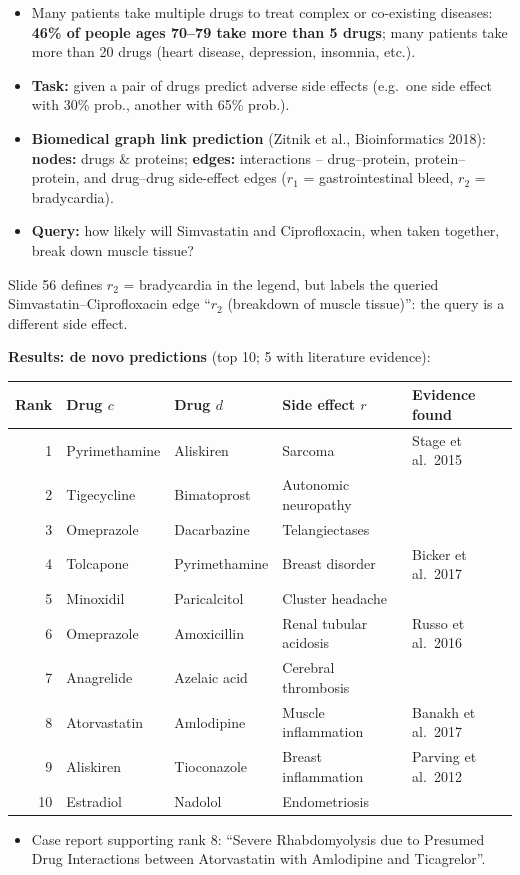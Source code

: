 \begin{itemize}
  \item Many patients take multiple drugs to treat complex or co-existing diseases:
    \textbf{46\% of people ages 70--79 take more than 5 drugs}; many patients take more than
    20 drugs (heart disease, depression, insomnia, etc.).
  \item \textbf{Task:} given a pair of drugs predict adverse side effects (e.g.\ one side
    effect with 30\% prob., another with 65\% prob.).
  \item \textbf{Biomedical graph link prediction} (Zitnik et al., Bioinformatics 2018):
    \textbf{nodes:} drugs \& proteins; \textbf{edges:} interactions -- drug--protein,
    protein--protein, and drug--drug side-effect edges ($r_1$ = gastrointestinal bleed,
    $r_2$ = bradycardia).
  \item \textbf{Query:} how likely will Simvastatin and Ciprofloxacin, when taken together,
    break down muscle tissue?
\end{itemize}

\begin{caution}
  Slide 56 defines $r_2$ = bradycardia in the legend, but labels the queried
  Simvastatin--Ciprofloxacin edge ``$r_2$ (breakdown of muscle tissue)'': the query is a
  different side effect.
\end{caution}

\textbf{Results: de novo predictions} (top 10; 5 with literature evidence):
\begin{center}\small
\begin{tabular}{@{}r l l l l@{}}
  \toprule
  Rank & Drug $c$ & Drug $d$ & Side effect $r$ & Evidence found \\
  \midrule
  1 & Pyrimethamine & Aliskiren & Sarcoma & Stage et al.\ 2015 \\
  2 & Tigecycline & Bimatoprost & Autonomic neuropathy & \\
  3 & Omeprazole & Dacarbazine & Telangiectases & \\
  4 & Tolcapone & Pyrimethamine & Breast disorder & Bicker et al.\ 2017 \\
  5 & Minoxidil & Paricalcitol & Cluster headache & \\
  6 & Omeprazole & Amoxicillin & Renal tubular acidosis & Russo et al.\ 2016 \\
  7 & Anagrelide & Azelaic acid & Cerebral thrombosis & \\
  8 & Atorvastatin & Amlodipine & Muscle inflammation & Banakh et al.\ 2017 \\
  9 & Aliskiren & Tioconazole & Breast inflammation & Parving et al.\ 2012 \\
  10 & Estradiol & Nadolol & Endometriosis & \\
  \bottomrule
\end{tabular}
\end{center}
\begin{itemize}
  \item Case report supporting rank 8: ``Severe Rhabdomyolysis due to Presumed Drug
    Interactions between Atorvastatin with Amlodipine and Ticagrelor''.
\end{itemize}

